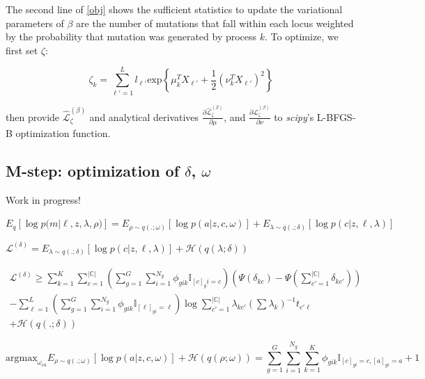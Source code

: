 \documentclass{article}
\newcommand{\Lagr}{\mathcal{L}}
\newcommand{\surrB}{\hat{\Lagr}^{(\beta)}_{\zeta}}
\begin{document}
The second line of \eqref{obj} shows the sufficient statistics to update the variational parameters of $\beta$ are the number of mutations that fall within each locus weighted by the probability that mutation was generated by process $k$. To optimize, we first set $\zeta$:

\begin{equation}
\zeta_k = \sum_{\ell'=1}^L l_{\ell'}\textrm{exp} \left\{ \mu_k^T X_{\ell'} + \frac{1}{2}(\nu_k^T X_{\ell'})^2 \right\}
\end{equation}

then provide $\surrB$ and analytical derivatives $\frac{\partial\surrB}{\partial\mu}$, and $\frac{\partial\surrB}{\partial\nu}$ to \emph{scipy}'s L-BFGS-B optimization function.


\subsection{M-step: optimization of $\delta$, $\omega$ }

Work in progress!

$ E_q [\log{p(m | \ell, z, \lambda, \rho})] = E_{\rho \sim q(.;\omega)} [\log p(a|z,c,\omega)] + E_{\lambda \sim q(.;\delta)} [\log p(c|z,\ell,\lambda) ]$

$\Lagr^{(\delta)} = E_{\lambda \sim q(.;\delta)} [\log p(c|z,\ell,\lambda)] + \mathcal{H}(q(\lambda; \delta)) $

\begin{equation} \label{surragate}
\begin{split}
\Lagr^{(\delta)} \geq \sum_{k=1}^K \sum_{c=1}^{|\mathbb{C}|} \left(\sum_{g=1}^G\sum_{i=1}^{N_g} \phi_{gik} \mathbb{I}_{[c]_gi = c}\right) \left( \Psi(\delta_{kc}) - 		\Psi(\sum_{c'=1}^{|\mathbb{C}|} \delta_{kc'}) \right) 
	\\ - \sum_{\ell=1}^L \left(\sum_{g=1}^G\sum_{i=1}^{N_g} \phi_{gik} \mathbb{I}_{[\ell]_{gi} = \ell} \right) \log{\sum_{c'=1}^{|\mathbb{C}|} \lambda_{kc'}(\sum \lambda_k)^{-1} t_{c'\ell}} \\
	+ \mathcal{H}(q(.;\delta))
\end{split}
\end{equation}


\begin{equation}
\mathrm{argmax}_{\omega_{ca}} E_{\rho \sim q(.;\omega)} [\log p(a|z,c,\omega)] + \mathcal{H}(q(\rho; \omega)) = \sum_{g=1}^G\sum_{i=1}^{N_g}\sum_{k=1}^K \phi_{gik} \mathbb{I}_{[c]_{gi} =c, [a]_{gi} = a} + 1
\end{equation}
\end{document}
